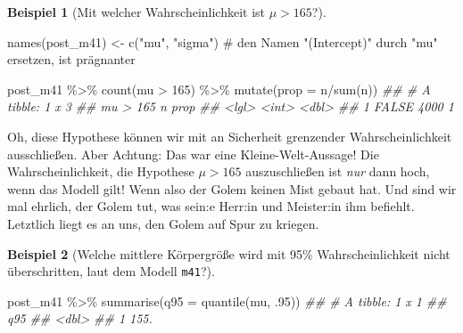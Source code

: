 \documentclass[
  a4paper,
  DIV=11]{scrreprt}
\newenvironment{Shaded}{\begin{snugshade}}{\end{snugshade}}
\newcommand{\AttributeTok}[1]{\textcolor[rgb]{0.40,0.45,0.13}{#1}}
\newcommand{\CommentTok}[1]{\textcolor[rgb]{0.37,0.37,0.37}{#1}}
\newcommand{\DecValTok}[1]{\textcolor[rgb]{0.68,0.00,0.00}{#1}}
\newcommand{\DocumentationTok}[1]{\textcolor[rgb]{0.37,0.37,0.37}{\textit{#1}}}
\newcommand{\FunctionTok}[1]{\textcolor[rgb]{0.28,0.35,0.67}{#1}}
\newcommand{\NormalTok}[1]{\textcolor[rgb]{0.00,0.23,0.31}{#1}}
\newcommand{\OtherTok}[1]{\textcolor[rgb]{0.00,0.23,0.31}{#1}}
\newcommand{\SpecialCharTok}[1]{\textcolor[rgb]{0.37,0.37,0.37}{#1}}
\newcommand{\StringTok}[1]{\textcolor[rgb]{0.13,0.47,0.30}{#1}}
\theoremstyle{definition}
\newtheorem{example}{Beispiel}[chapter]
\theoremstyle{remark}
\begin{document}
\leavevmode{}%
\begin{example}[Mit welcher Wahrscheinlichkeit ist
\(\mu>165\)?]\label{exm-kung2}

\begin{Shaded}
\begin{Highlighting}[]
\FunctionTok{names}\NormalTok{(post\_m41) }\OtherTok{\textless{}{-}} 
  \FunctionTok{c}\NormalTok{(}\StringTok{"mu"}\NormalTok{, }\StringTok{"sigma"}\NormalTok{)  }\CommentTok{\# den Namen "(Intercept)" durch "mu" ersetzen, ist prägnanter}

\NormalTok{post\_m41 }\SpecialCharTok{\%\textgreater{}\%} 
  \FunctionTok{count}\NormalTok{(mu }\SpecialCharTok{\textgreater{}} \DecValTok{165}\NormalTok{) }\SpecialCharTok{\%\textgreater{}\%} 
  \FunctionTok{mutate}\NormalTok{(}\AttributeTok{prop =}\NormalTok{ n}\SpecialCharTok{/}\FunctionTok{sum}\NormalTok{(n))}
\DocumentationTok{\#\# \# A tibble: 1 x 3}
\DocumentationTok{\#\#   \textasciigrave{}mu \textgreater{} 165\textasciigrave{}     n  prop}
\DocumentationTok{\#\#   \textless{}lgl\textgreater{}      \textless{}int\textgreater{} \textless{}dbl\textgreater{}}
\DocumentationTok{\#\# 1 FALSE       4000     1}
\end{Highlighting}
\end{Shaded}

Oh, diese Hypothese können wir mit an Sicherheit grenzender
Wahrscheinlichkeit ausschließen. Aber Achtung: Das war eine
Kleine-Welt-Aussage! Die Wahrscheinlichkeit, die Hypothese \(\mu > 165\)
auszuschließen ist \emph{nur} dann hoch, wenn das Modell gilt! Wenn also
der Golem keinen Mist gebaut hat. Und sind wir mal ehrlich, der Golem
tut, was sein:e Herr:in und Meister:in ihm befiehlt. Letztlich liegt es
an uns, den Golem auf Spur zu kriegen.

\end{example}

\leavevmode{}%
\begin{example}[Welche mittlere Körpergröße wird mit 95\%
Wahrscheinlichkeit nicht überschritten, laut dem Modell
\texttt{m41}?]\label{exm-kung3}

\begin{Shaded}
\begin{Highlighting}[]
\NormalTok{post\_m41 }\SpecialCharTok{\%\textgreater{}\%} 
  \FunctionTok{summarise}\NormalTok{(}\AttributeTok{q95 =} \FunctionTok{quantile}\NormalTok{(mu, .}\DecValTok{95}\NormalTok{))}
\DocumentationTok{\#\# \# A tibble: 1 x 1}
\DocumentationTok{\#\#     q95}
\DocumentationTok{\#\#   \textless{}dbl\textgreater{}}
\DocumentationTok{\#\# 1  155.}
\end{Highlighting}
\end{Shaded}

\end{example}
\end{document}
